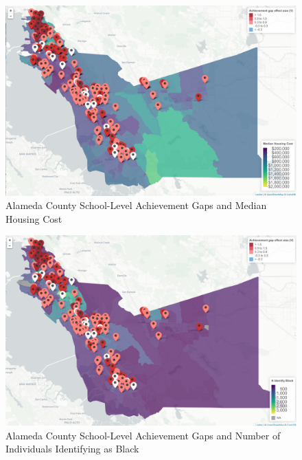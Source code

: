 \documentclass[man, fleqn, noextraspace]{apa6}
\theoremstyle{definition}
\theoremstyle{definition}
\theoremstyle{definition}
\theoremstyle{remark}
\begin{document}
\begin{figure}
\centering
\includegraphics{anderson_ncme18_files/screen_caps/median_house.png}
\caption{Alameda County School-Level Achievement Gaps and Median Housing
Cost}
\end{figure}

\begin{figure}
\centering
\includegraphics{anderson_ncme18_files/screen_caps/n_black.png}
\caption{Alameda County School-Level Achievement Gaps and Number of
Individuals Identifying as Black}
\end{figure}
\end{document}
